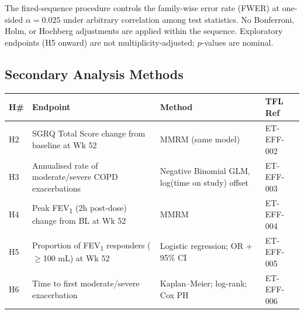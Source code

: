 \begin{tcolorbox}[sapnote, title={\faIcon{shield-alt}\ Family-Wise Error Rate Control}]
  The fixed-sequence procedure controls the family-wise error rate (FWER) at one-sided
  $\alpha = 0.025$ under arbitrary correlation among test statistics. No Bonferroni,
  Holm, or Hochberg adjustments are applied within the sequence.
  Exploratory endpoints (H5 onward) are not multiplicity-adjusted; $p$-values are nominal.
\end{tcolorbox}

\subsection{Secondary Analysis Methods}

\begin{tabularx}{\linewidth}{@{}
  >{\centering\arraybackslash}p{8mm}
  >{\raggedright\arraybackslash}X
  >{\raggedright\arraybackslash}p{38mm}
  >{\centering\arraybackslash}p{16mm}@{}}
\toprule
\rowcolor{sapfog}
\textbf{H\#} & \textbf{Endpoint} & \textbf{Method} & \textbf{TFL Ref} \\
\midrule
H2 & SGRQ Total Score change from baseline at Wk 52 & MMRM (same model) & ET-EFF-002 \\
\addlinespace[2pt]
H3 & Annualised rate of moderate/severe COPD exacerbations & Negative Binomial GLM, log(time on study) offset & ET-EFF-003 \\
\addlinespace[2pt]
H4 & Peak FEV\textsubscript{1} (2h post-dose) change from BL at Wk 52 & MMRM & ET-EFF-004 \\
\addlinespace[2pt]
H5 & Proportion of FEV\textsubscript{1} responders ($\geq$100 mL) at Wk 52 & Logistic regression; OR + 95\% CI & ET-EFF-005 \\
\addlinespace[2pt]
H6 & Time to first moderate/severe exacerbation & Kaplan--Meier; log-rank; Cox PH & ET-EFF-006 \\
\bottomrule
\end{tabularx}

\clearpage

